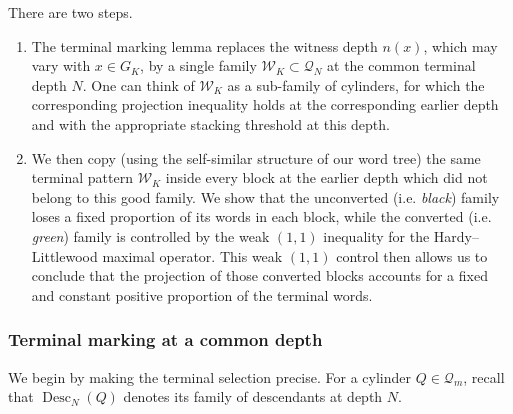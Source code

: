 \documentclass[12pt]{amsart}
\numberwithin{equation}{section}
\begin{document}
There are two steps.  
\begin{enumerate}
\item The terminal marking lemma replaces the witness
depth $n(x)$, which may vary with $x\in G_K$, by a single family
$\mathscr W_K\subset\mathscr Q_N$ at the common terminal depth $N$. One can think of $\mathscr{W}_K$ as a sub-family of cylinders, for which the corresponding projection inequality holds at the corresponding earlier depth and with the appropriate stacking threshold at this depth.
\medskip
\item We then copy (using the self-similar structure of our word tree) the same terminal pattern $\mathscr{W}_K$ inside every block at the earlier depth which did not belong to this good family.  We show that the
unconverted (i.e. \textit{black}) family loses a fixed proportion of its words in
each block, while the converted (i.e. \textit{green}) family is controlled by the weak
$(1,1)$ inequality for the Hardy--Littlewood maximal operator. This weak $(1,1)$ control then allows us to conclude that the projection of those converted blocks accounts for a fixed and constant positive proportion of the terminal words.
\end{enumerate}

\subsubsection{Terminal marking at a common depth}

We begin by making the terminal selection precise.  For a cylinder
$Q\in\mathscr Q_m$, recall that $\operatorname{Desc}_N(Q)$ denotes its family
of descendants at depth $N$.
\end{document}
